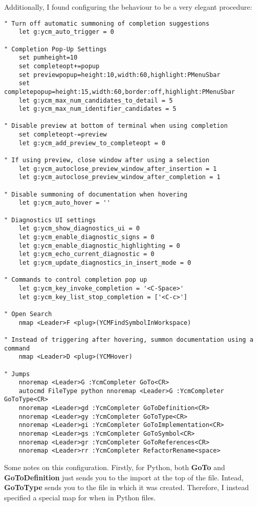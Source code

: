 Additionally, I found configuring the behaviour to be a very elegant procedure:
\begin{lstlisting}
" Turn off automatic summoning of completion suggestions
    let g:ycm_auto_trigger = 0

" Completion Pop-Up Settings
    set pumheight=10
    set completeopt+=popup
    set previewpopup=height:10,width:60,highlight:PMenuSbar
    set completepopup=height:15,width:60,border:off,highlight:PMenuSbar
    let g:ycm_max_num_candidates_to_detail = 5
    let g:ycm_max_num_identifier_candidates = 5

" Disable preview at bottom of terminal when using completion
    set completeopt-=preview
    let g:ycm_add_preview_to_completeopt = 0

" If using preview, close window after using a selection
    let g:ycm_autoclose_preview_window_after_insertion = 1
    let g:ycm_autoclose_preview_window_after_completion = 1

" Disable summoning of documentation when hovering
    let g:ycm_auto_hover = ''

" Diagnostics UI settings
    let g:ycm_show_diagnostics_ui = 0
    let g:ycm_enable_diagnostic_signs = 0
    let g:ycm_enable_diagnostic_highlighting = 0
    let g:ycm_echo_current_diagnostic = 0
    let g:ycm_update_diagnostics_in_insert_mode = 0

" Commands to control completion pop up
    let g:ycm_key_invoke_completion = '<C-Space>'
    let g:ycm_key_list_stop_completion = ['<C-c>']

" Open Search
    nmap <Leader>F <plug>(YCMFindSymbolInWorkspace)

" Instead of triggering after hovering, summon documentation using a command
    nmap <Leader>D <plug>(YCMHover)

" Jumps
    nnoremap <Leader>G :YcmCompleter GoTo<CR>
    autocmd FileType python nnoremap <Leader>G :YcmCompleter GoToType<CR>
    nnoremap <Leader>gd :YcmCompleter GoToDefinition<CR>
    nnoremap <Leader>gy :YcmCompleter GoToType<CR>
    nnoremap <Leader>gi :YcmCompleter GoToImplementation<CR>
    nnoremap <Leader>gs :YcmCompleter GoToSymbol<CR>
    nnoremap <Leader>gr :YcmCompleter GoToReferences<CR>
    nnoremap <Leader>rr :YcmCompleter RefactorRename<space>
\end{lstlisting}
Some notes on this configuration. Firstly, for Python, both \textbf{GoTo} and
\textbf{GoToDefinition} just sends you to the import at the top of the file.
Intead, \textbf{GoToType} sends you to the file in which it was created.
Therefore, I instead specified a special map for when in Python files.\\


